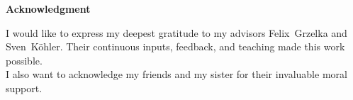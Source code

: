 \vspace*{\fill}
\begin{center}\textsf{\textbf{Acknowledgment}}\end{center}

I would like to express my deepest gratitude to my advisors Felix~Grzelka and Sven~Köhler. 
Their continuous inputs, feedback, and teaching made this work possible. \\

I also want to acknowledge my friends and my sister for their invaluable moral support.\vspace*{\fill}
